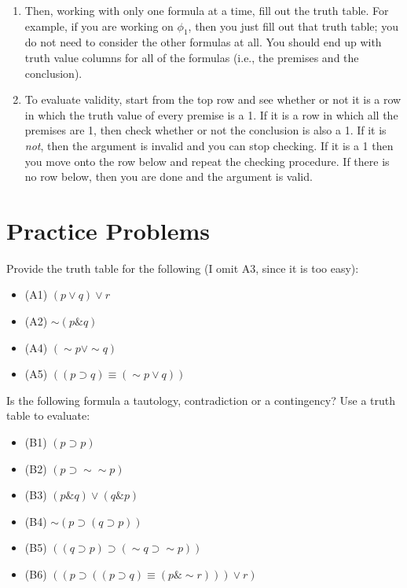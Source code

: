 \documentclass[
]{book}
\providecommand{\tightlist}{%
  \setlength{\itemsep}{0pt}\setlength{\parskip}{0pt}}
\begin{document}
\begin{enumerate}
\def\labelenumi{\arabic{enumi}.}
\setcounter{enumi}{1}
\item
  Then, working with only one formula at a time, fill out the truth table. For example, if you are working on \(\phi_1\), then you just fill out that truth table; you do not need to consider the other formulas at all. You should end up with truth value columns for all of the formulas (i.e., the premises and the conclusion).
\item
  To evaluate validity, start from the top row and see whether or not it is a row in which the truth value of every premise is a 1. If it is a row in which all the premises are 1, then check whether or not the conclusion is also a 1. If it is \emph{not}, then the argument is invalid and you can stop checking. If it is a 1 then you move onto the row below and repeat the checking procedure. If there is no row below, then you are done and the argument is valid.
\end{enumerate}

\hypertarget{practice-problems-1}{%
\section{Practice Problems}\label{practice-problems-1}}

Provide the truth table for the following (I omit A3, since it is too easy):

\begin{itemize}
\tightlist
\item
  (A1) \((p \lor q) \lor r\)
\item
  (A2) \(\sim (p \& q)\)
\item
  (A4) \((\sim p \lor \sim q)\)
\item
  (A5) \(((p \supset q) \equiv (\sim p \lor q))\)
\end{itemize}

Is the following formula a tautology, contradiction or a contingency? Use a truth table to evaluate:

\begin{itemize}
\tightlist
\item
  (B1) \((p \supset p)\)
\item
  (B2) \((p \supset \sim\sim p)\)
\item
  (B3) \((p \& q) \lor (q \& p)\)
\item
  (B4) \(\sim (p \supset (q \supset p))\)
\item
  (B5) \(((q \supset p) \supset (\sim q \supset \sim p))\)
\item
  (B6) \(((p \supset ((p \supset q) \equiv (p \& \sim r))) \lor r)\)
\end{itemize}
\end{document}

